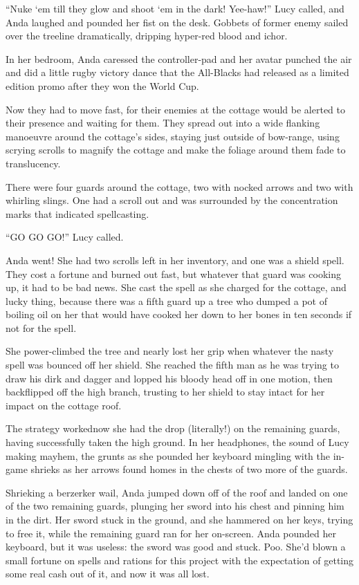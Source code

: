 “Nuke ‘em till they glow and shoot ‘em in the dark! Yee-haw!” Lucy
called, and Anda laughed and pounded her fist on the desk. Gobbets
of former enemy sailed over the treeline dramatically, dripping
hyper-red blood and ichor.

In her bedroom, Anda caressed the controller-pad and her avatar
punched the air and did a little rugby victory dance that the
All-Blacks had released as a limited edition promo after they won
the World Cup.

Now they had to move fast, for their enemies at the cottage would
be alerted to their presence and waiting for them. They spread out
into a wide flanking manoeuvre around the cottage’s sides, staying
just outside of bow-range, using scrying scrolls to magnify the
cottage and make the foliage around them fade to translucency.

There were four guards around the cottage, two with nocked arrows
and two with whirling slings. One had a scroll out and was
surrounded by the concentration marks that indicated spellcasting.

“GO GO GO!” Lucy called.

Anda went! She had two scrolls left in her inventory, and one was a
shield spell. They cost a fortune and burned out fast, but whatever
that guard was cooking up, it had to be bad news. She cast the
spell as she charged for the cottage, and lucky thing, because
there was a fifth guard up a tree who dumped a pot of boiling oil
on her that would have cooked her down to her bones in ten seconds
if not for the spell.

She power-climbed the tree and nearly lost her grip when whatever
the nasty spell was bounced off her shield. She reached the fifth
man as he was trying to draw his dirk and dagger and lopped his
bloody head off in one motion, then backflipped off the high
branch, trusting to her shield to stay intact for her impact on the
cottage roof.

The strategy worked\dash{}now she had the drop (literally!) on the
remaining guards, having successfully taken the high ground. In her
headphones, the sound of Lucy making mayhem, the grunts as she
pounded her keyboard mingling with the in-game shrieks as her
arrows found homes in the chests of two more of the guards.

Shrieking a berzerker wail, Anda jumped down off of the roof and
landed on one of the two remaining guards, plunging her sword into
his chest and pinning him in the dirt. Her sword stuck in the
ground, and she hammered on her keys, trying to free it, while the
remaining guard ran for her on-screen. Anda pounded her keyboard,
but it was useless: the sword was good and stuck. Poo. She’d blown
a small fortune on spells and rations for this project with the
expectation of getting some real cash out of it, and now it was all
lost.

